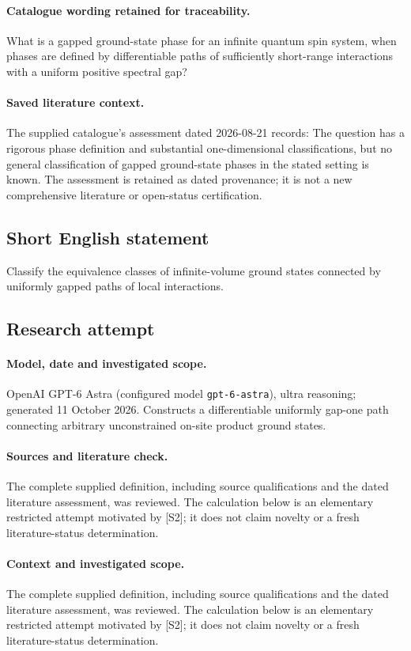 \documentclass[11pt]{article}
\begin{document}
\paragraph{Catalogue wording retained for traceability.}
What is a gapped ground-state phase for an infinite quantum spin system, when phases are defined by differentiable paths of sufficiently short-range interactions with a uniform positive spectral gap?

\paragraph{Saved literature context.} The supplied catalogue's assessment dated 2026-08-21 records: The question has a rigorous phase definition and substantial one-dimensional classifications, but no general classification of gapped ground-state phases in the stated setting is known. The assessment is retained as dated provenance; it is not a new comprehensive literature or open-status certification.
\subsection{Short English statement}
Classify the equivalence classes of infinite-volume ground states connected by uniformly gapped paths of local interactions.
\subsection{Research attempt}
\paragraph{Model, date and investigated scope.}
OpenAI GPT-6 Astra (configured model \texttt{gpt-6-astra}), ultra reasoning; generated 11 October 2026. Constructs a differentiable uniformly gap-one path connecting arbitrary unconstrained on-site product ground states.

\paragraph{Sources and literature check.}
The complete supplied definition, including source qualifications and the dated literature assessment, was reviewed. The calculation below is an elementary restricted attempt motivated by [S2]; it does not claim novelty or a fresh literature-status determination.

\paragraph{Context and investigated scope.} The complete supplied definition, including source qualifications and the dated literature assessment, was reviewed. The calculation below is an elementary restricted attempt motivated by [S2]; it does not claim novelty or a fresh literature-status determination.
\end{document}
